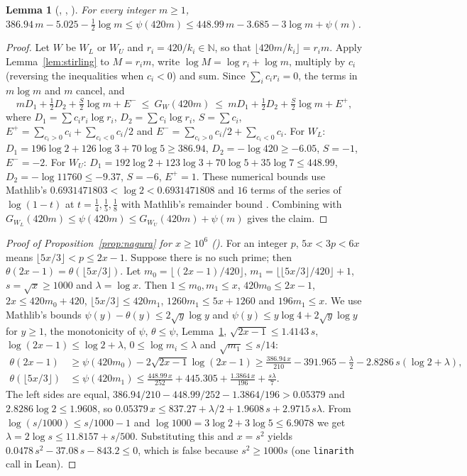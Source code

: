 \documentclass[11pt]{amsart}
\theoremstyle{plain}
\newtheorem{lemma}[theorem]{Lemma}
\theoremstyle{definition}
\newcommand{\N}{\mathbb{N}}
\newcommand{\fl}[1]{\lfloor #1\rfloor}
\begin{document}
\begin{lemma}[, , ]\label{lem:psi}
For every integer $m\ge1$, \ $386.94\,m-5.025-\tfrac12\log m\le\psi(420m)\le448.99\,m-3.685-3\log m+\psi(m)$.
\end{lemma}

\begin{proof}
Let $W$ be $W_L$ or $W_U$ and $r_i=420/k_i\in\N$, so that $\fl{420m/k_i}=r_im$. Apply Lemma~\ref{lem:stirling} to $M=r_im$, write $\log M=\log r_i+\log m$, multiply by $c_i$ (reversing the inequalities when $c_i<0$) and sum. Since $\sum_ic_ir_i=0$, the terms in $m\log m$ and $m$ cancel, and
\[
mD_1+\tfrac12D_2+\tfrac S2\log m+E^-\ \le\ G_W(420m)\ \le\ mD_1+\tfrac12D_2+\tfrac S2\log m+E^+,
\]
where $D_1=\sum c_ir_i\log r_i$, $D_2=\sum c_i\log r_i$, $S=\sum c_i$, $E^+=\sum_{c_i>0}c_i+\sum_{c_i<0}c_i/2$ and $E^-=\sum_{c_i>0}c_i/2+\sum_{c_i<0}c_i$. For $W_L$: $D_1=196\log2+126\log3+70\log5\ge386.94$, $D_2=-\log420\ge-6.05$, $S=-1$, $E^-=-2$. For $W_U$: $D_1=192\log2+123\log3+70\log5+35\log7\le448.99$, $D_2=-\log11760\le-9.37$, $S=-6$, $E^+=1$. These numerical bounds use Mathlib's $0.6931471803<\log2<0.6931471808$ and $16$ terms of the series of $\log(1-t)$ at $t=\frac14,\frac15,\frac18$ with Mathlib's remainder bound . Combining with $G_{W_L}(420m)\le\psi(420m)\le G_{W_U}(420m)+\psi(m)$ gives the claim.
\end{proof}

\begin{proof}[Proof of Proposition~\ref{prop:nagura} for $x\ge10^6$ \textup{()}]
For an integer $p$, $5x<3p<6x$ means $\fl{5x/3}<p\le2x-1$. Suppose there is no such prime; then $\theta(2x-1)=\theta(\fl{5x/3})$. Let $m_0=\fl{(2x-1)/420}$, $m_1=\fl{\fl{5x/3}/420}+1$, $s=\sqrt x\ge1000$ and $\lambda=\log x$. Then $1\le m_0,m_1\le x$, $420m_0\le2x-1$, $2x\le420m_0+420$, $\fl{5x/3}\le420m_1$, $1260m_1\le5x+1260$ and $196m_1\le x$. We use Mathlib's bounds $\psi(y)-\theta(y)\le2\sqrt y\log y$ and $\psi(y)\le y\log4+2\sqrt y\log y$ for $y\ge1$, the monotonicity of $\psi$, $\theta\le\psi$, Lemma~\ref{lem:psi}, $\sqrt{2x-1}\le1.4143\,s$, $\log(2x-1)\le\log2+\lambda$, $0\le\log m_i\le\lambda$ and $\sqrt{m_1}\le s/14$:
\begin{align*}
\theta(2x-1)&\ge\psi(420m_0)-2\sqrt{2x-1}\log(2x-1)\ge\frac{386.94\,x}{210}-391.965-\frac\lambda2-2.8286\,s(\log2+\lambda),\\
\theta(\fl{5x/3})&\le\psi(420m_1)\le\frac{448.99\,x}{252}+445.305+\frac{1.3864\,x}{196}+\frac{s\lambda}{7}.
\end{align*}
The left sides are equal, $386.94/210-448.99/252-1.3864/196>0.05379$ and $2.8286\log2\le1.9608$, so $0.05379\,x\le837.27+\lambda/2+1.9608\,s+2.9715\,s\lambda$. From $\log(s/1000)\le s/1000-1$ and $\log1000=3\log2+3\log5\le6.9078$ we get $\lambda=2\log s\le11.8157+s/500$. Substituting this and $x=s^2$ yields $0.0478\,s^2-37.08\,s-843.2\le0$, which is false because $s^2\ge1000s$ (one \texttt{linarith} call in Lean).
\end{proof}
\end{document}
